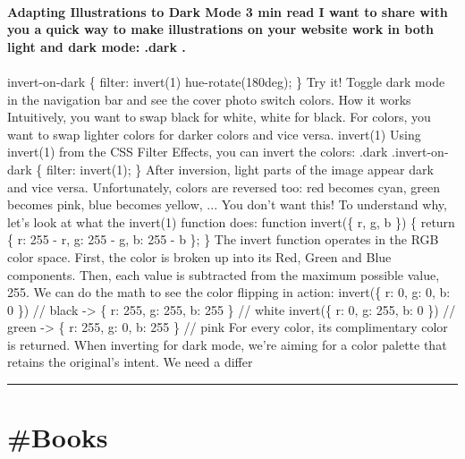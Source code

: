 \documentclass[10pt,a4paper]{article}
\begin{document}
\begin{multicols*}{2}
\paragraph{}
\textbf{Adapting Illustrations to Dark Mode
3 min read
I want to share with you a quick way to make illustrations on your website work in both light and dark mode:
.dark .}
\paragraph{}
invert-on-dark \{ filter: invert(1) hue-rotate(180deg); \}
Try it!
Toggle dark mode in the navigation bar and see the cover photo switch colors.
How it works
Intuitively, you want to swap black for white, white for black. For colors, you want to swap lighter colors for darker colors and vice versa.
invert(1)
Using
invert(1) from the CSS Filter Effects, you can invert the colors:
.dark .invert-on-dark \{ filter: invert(1); \}
After inversion, light parts of the image appear dark and vice versa.
Unfortunately, colors are reversed too: red becomes cyan, green becomes pink, blue becomes yellow, ... You don't want this!
To understand why, let's look at what the
invert(1) function does:
function invert(\{ r, g, b \}) \{ return \{ r: 255 - r, g: 255 - g, b: 255 - b \}; \}
The invert function operates in the RGB color space. First, the color is broken up into its Red, Green and Blue components. Then, each value is subtracted from the maximum possible value, 255.
We can do the math to see the color flipping in action:
invert(\{ r: 0, g: 0, b: 0 \}) // black -> \{ r: 255, g: 255, b: 255 \} // white invert(\{ r: 0, g: 255, b: 0 \}) // green -> \{ r: 255, g: 0, b: 255 \} // pink
For every color, its complimentary color is returned. When inverting for dark mode, we're aiming for a color palette that retains the original's intent. We need a differ
\par\noindent\textcolor{red}{\rule{\linewidth}{0.2mm}}
\vfill
\null
\end{multicols*}

\newpage
\section{\#Books}
\end{document}
